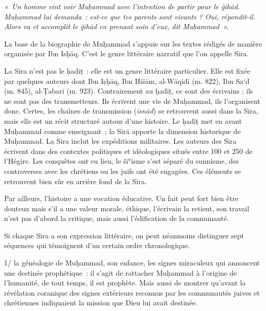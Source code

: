 \emph{«~Un homme vint voir Muḥammad avec l'intention de partir pour le
ǧihād. Muḥammad lui demanda~: est-ce que tes parents sont vivants ? Oui,
répondit-il. Alors va et accomplit le ǧihād en prenant soin d'eux, dit
Muḥammad~».}

La base de la biographie de Muḥammad s'appuie sur les textes rédigés de
manière organisée par Ibn Isḥāq. C'est le genre littéraire narratif que
l'on appelle Sīra.


La Sīra n'est pas le ḥadīṯ~: elle est un genre littéraire particulier.
Elle est fixée par quelques auteurs dont Ibn Iṣḥāq, Ibn Hišām, al-Wāqidī
(m. 822), Ibn Sa`d (m. 845), al-Ṭabarī (m. 923). Contrairement au ḥadīṯ,
ce sont des écrivains ; ils ne sont pas des transmetteurs. Ils écrivent
une vie de Muḥammad, ils l'organisent donc. Certes, les chaînes de
transmission (\emph{isnād}) se retrouvent aussi dans la Sīra, mais elle
est un récit structuré autour d'une histoire. Le ḥadīṯ met en avant
Muḥammad comme enseignant~; la Sirā apporte la dimension historique de
Muḥammad. La Sīra inclut les expéditions militaires. Les auteurs des
Sīra écrivent dans des contextes politiques et idéologiques situés entre
100 et 250 de l'Hégire. Les conquêtes ont eu lieu, le šīʿisme s'est
séparé du sunnisme, des controverses avec les chrétiens ou les juifs ont
été engagées. Ces éléments se retrouvent bien sûr en arrière fond de la
Sīra.

Par ailleurs, l'histoire a une vocation éducative. Un fait peut fort
bien être douteux mais s'il a une valeur morale, éthique, l'écrivain la
retient, son travail n'est pas d'abord la critique, mais aussi
l'édification de la communauté.

Si chaque Sīra a son expression littéraire, on peut néanmoins distinguer
sept séquences qui témoignent d'un certain ordre chronologique.


1/ la généalogie de Muḥammad, son enfance, les signes miraculeux qui
annoncent une destinée prophétique~: il s'agit de rattacher Muḥammad à
l'origine de l'humanité, de tout temps, il est prophète. Mais aussi de
montrer qu'avant la révélation coranique des signes extérieurs reconnus
par les communautés juives et chrétiennes indiquaient la mission que
Dieu lui avait destinée.

